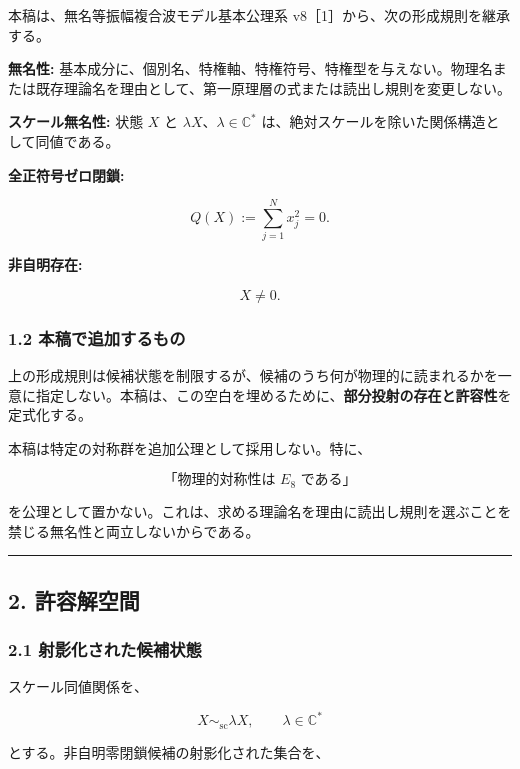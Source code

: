 \documentclass[
  a4paper,
  ja=minimal,
  xelatex,
  paragraph-mark={},
]{bxjsarticle}
\begin{document}
本稿は、無名等振幅複合波モデル基本公理系
v8［1］から、次の形成規則を継承する。

\textbf{無名性:}
基本成分に、個別名、特権軸、特権符号、特権型を与えない。物理名または既存理論名を理由として、第一原理層の式または読出し規則を変更しない。

\textbf{スケール無名性:} 状態 \(X\) と
\(\lambda X\)、\(\lambda\in\mathbb C^\ast\)
は、絶対スケールを除いた関係構造として同値である。

\textbf{全正符号ゼロ閉鎖:}

\[
Q(X)
:=
\sum_{j=1}^{N}x_j^2
{}=0.
\]

\textbf{非自明存在:}

\[
X\neq0.
\]

\subsubsection{1.2
本稿で追加するもの}\label{ux672cux7a3fux3067ux8ffdux52a0ux3059ux308bux3082ux306e}

上の形成規則は候補状態を制限するが、候補のうち何が物理的に読まれるかを一意に指定しない。本稿は、この空白を埋めるために、\textbf{部分投射の存在と許容性}を定式化する。

本稿は特定の対称群を追加公理として採用しない。特に、

\[
\text{「物理的対称性は }E_8\text{ である」}
\]

を公理として置かない。これは、求める理論名を理由に読出し規則を選ぶことを禁じる無名性と両立しないからである。

\begin{center}\rule{0.5\linewidth}{0.5pt}\end{center}

\subsection{2. 許容解空間}\label{ux8a31ux5bb9ux89e3ux7a7aux9593}

\subsubsection{2.1
射影化された候補状態}\label{ux5c04ux5f71ux5316ux3055ux308cux305fux5019ux88dcux72b6ux614b}

スケール同値関係を、

\[
X\sim_{\mathrm{sc}}\lambda X,
\qquad
\lambda\in\mathbb C^\ast
\]

とする。非自明零閉鎖候補の射影化された集合を、
\end{document}

